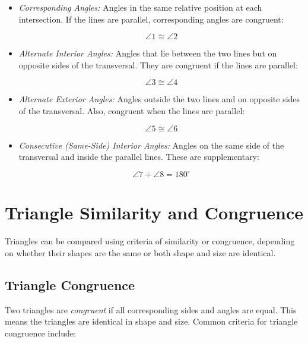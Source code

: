 \begin{itemize}

	\item \emph{Corresponding Angles:} Angles in the same relative position at each intersection. If the 
	lines are parallel, corresponding angles are congruent:
	 
		\[
 		   \angle 1 \cong \angle 2
   		\]
    
    \item \emph{Alternate Interior Angles:} Angles that lie between the two lines but on opposite sides 
	of the transversal. They are congruent if the lines are parallel:
    
		\[
  		  \angle 3 \cong \angle 4
    	\]
    
    \item \emph{Alternate Exterior Angles:} Angles outside the two lines and on opposite sides of the 
	transversal. Also, congruent when the lines are parallel:
    
		\[
 		   \angle 5 \cong \angle 6
    	\]
    
    \item \emph{Consecutive (Same-Side) Interior Angles:} Angles on the same side of the transversal and 
	inside the parallel lines. These are supplementary:
    
		  \[
 	   			\angle 7 + \angle 8 = 180^\circ
   	      \]
\end{itemize}

\section{Triangle Similarity and Congruence}

Triangles can be compared using criteria of similarity or congruence, depending on whether their shapes 
are the same or both shape and size are identical.

\subsection{Triangle Congruence}

Two triangles are \emph{congruent} if all corresponding sides and angles are equal. This means the 
triangles are identical in shape and size. Common criteria for triangle congruence include:


